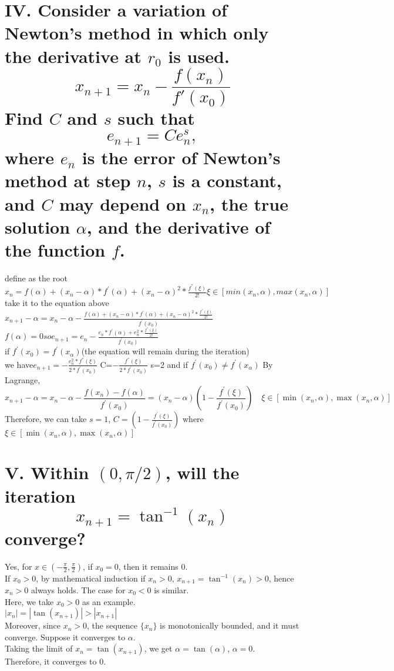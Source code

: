 \documentclass[a4paper]{article}
\begin{document}
\section*{IV. Consider a variation of Newton's method in which only the derivative at \( r_0 \) is used.
\[
x_{n+1} = x_n - \frac{f(x_n)}{f'(x_0)}
\]
Find \( C \) and \( s \) such that
\[
e_{n+1} = C e_n^s,
\]
where \( e_n \) is the error of Newton's method at step \( n \), \( s \) is a constant, and \( C \) may depend on \( x_n \), the true solution \( \alpha \), and the derivative of the function \( f \).}
define \alpha as the root\\
\(x_n=f(\alpha)+(x_n-\alpha)*f^{'}(\alpha)+(x_n-\alpha)^2*\frac{f^{''}(\xi)}{2!} \xi \in [min(x_n,\alpha),max(x_n,\alpha)]\)\\
take it to the equation above\\
\(x_{n+1}-\alpha=x_n-\alpha-\frac{f(\alpha)+(x_n-\alpha)*f^{'}(\alpha)+(x_n-\alpha)^2*\frac{f^{''}(\xi)}{2!}}{f^{'}(x_0)}\)\\
\(f(\alpha)=0  so e_{n+1}=e_n-\frac{e_n*f^{'}(\alpha)+e_n^2*\frac{f^{''}(\xi)}{2!}}{f^{'}(x_0)}\)\\
if \(f^{'}(x_0)=f^{'}(x_{\alpha}) \)(the equation will remain during the iteration) \\
we have\(e_{n+1}=-\frac{e_n^2*f^{''}(\xi)}{2*f^{'}(x_0)}\)
C=\(-\frac{f^{''}(\xi)}{2*f^{'}(x_0)}\)
s=2
and if \(f^{'}(x_0) \neq f^{'}(x_{\alpha}) \)
By Lagrange,
\[
x_{n+1}-\alpha = x_n-\alpha-\frac{f(x_n)-f(\alpha)}{f^{'}(x_0)} = (x_n-\alpha)\left(1-\frac{f^{'}(\xi)}{f^{'}(x_0)}\right) \quad \xi \in [\min(x_n,\alpha), \max(x_n,\alpha)]
\]
Therefore, we can take \( s = 1 \), \( C = \left(1-\frac{f^{'}(\xi)}{f^{'}(x_0)}\right) \) where \( \xi \in [\min(x_n,\alpha), \max(x_n,\alpha)] \)

\section*{V. Within \( (0, \pi/2) \), will the iteration
\[
x_{n+1} = \tan^{-1}(x_n)
\]
converge?}

Yes, for \( x \in \left(-\frac{\pi}{2}, \frac{\pi}{2}\right) \), if \( x_0 = 0 \), then it remains 0.\\
If \( x_0 > 0 \), by mathematical induction if \( x_n > 0 \), \( x_{n+1} = \tan^{-1}(x_n) > 0 \), hence \( x_n > 0 \) always holds. The case for \( x_0 < 0 \) is similar.\\
Here, we take \( x_0 > 0 \) as an example.\\
\( |x_n| = |\tan(x_{n+1})| > |x_{n+1}| \)\\
Moreover, since \( x_n > 0 \), the sequence \( \{x_n\} \) is monotonically bounded, and it must converge. Suppose it converges to \( \alpha \).\\
Taking the limit of \( x_n = \tan(x_{n+1}) \), we get \( \alpha = \tan(\alpha) \), \( \alpha = 0 \).\\
Therefore, it converges to 0.
\end{document}
